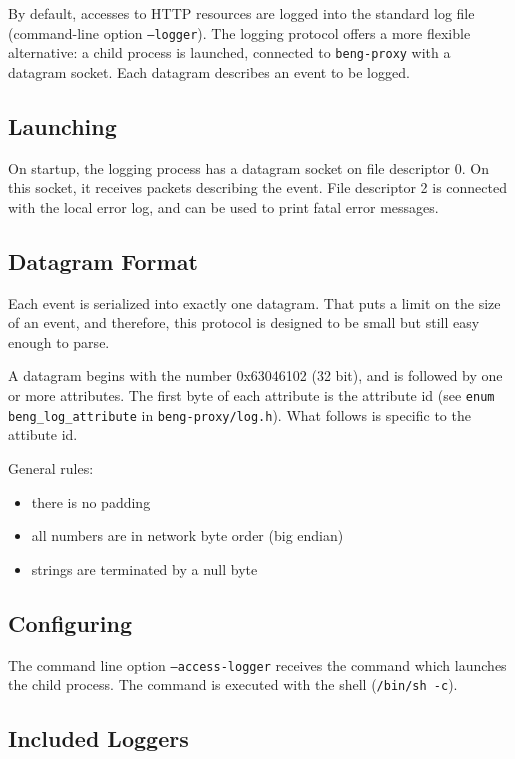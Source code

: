 \documentclass[a4paper,12pt]{article}
\begin{document}
By default, accesses to HTTP resources are logged into the standard
log file (command-line option \texttt{--logger}).  The logging
protocol offers a more flexible alternative: a child process is
launched, connected to \texttt{beng-proxy} with a datagram socket.
Each datagram describes an event to be logged.

\subsection{Launching}

On startup, the logging process has a datagram socket on file
descriptor 0.  On this socket, it receives packets describing the
event.  File descriptor 2 is connected with the local error log, and
can be used to print fatal error messages.

\subsection{Datagram Format}

Each event is serialized into exactly one datagram.  That puts a limit
on the size of an event, and therefore, this protocol is designed to
be small but still easy enough to parse.

A datagram begins with the number 0x63046102 (32 bit), and is followed
by one or more attributes.  The first byte of each attribute is the
attribute id (see \texttt{enum beng\_log\_attribute} in
\texttt{beng-proxy/log.h}).  What follows is specific to the attibute
id.

General rules:

\begin{itemize}
\item there is no padding
\item all numbers are in network byte order (big endian)
\item strings are terminated by a null byte
\end{itemize}

\subsection{Configuring}

The command line option \texttt{--access-logger} receives the command
which launches the child process.  The command is executed with the
shell (\texttt{/bin/sh -c}).

\subsection{Included Loggers}
\end{document}
